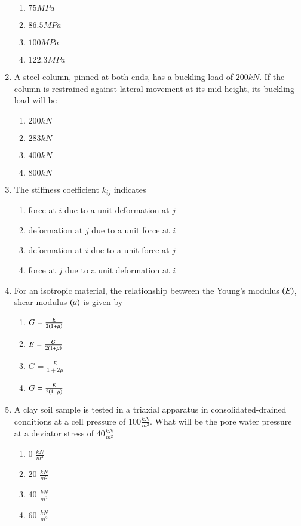 \documentclass[journal]{IEEEtran}
\begin{document}
\begin{enumerate}
\begin{enumerate}
			\item $75 MPa$
			\item $86.5 MPa$
			\item $100 MPa$
			\item $122.3 MPa$
		\end{enumerate}
	\item
	A steel column, pinned at both ends, has a buckling load of $200 kN$. If the column is restrained against lateral movement at its mid-height, its buckling load will be 
		\begin{enumerate}
			\item $200 kN$
			\item $283 kN$
			\item $400 kN$
			\item $800 kN$
		\end{enumerate}
	\item
	The stiffness coefficient $k_{ij}$ indicates
		\begin{enumerate}
			\item force at $i$ due to a unit deformation at $j$
			\item deformation at $j$ due to a unit force at $i$
			\item deformation at $i$ due to a unit force at $j$
			\item force at $j$ due to a unit deformation at $i$
		\end{enumerate}
	\item
	For an isotropic material, the relationship between the Young's modulus $\left(E\right)$, shear modulus $\left(\mu\right)$ is given by 
		\begin{enumerate}
			\item $G = \frac{E}{2\left(1+\mu\right)}$
			\item $E = \frac{G}{2\left(1+\mu\right)}$
			\item $G = \frac{E}{1 + 2\mu}$
			\item $G = \frac{E}{2\left(1-\mu\right)}$
		\end{enumerate}
	\item
	A clay soil sample is tested in a triaxial apparatus in consolidated-drained conditions at a cell pressure of $100 \frac{kN}{m^2}$. What will be the pore water pressure at a deviator stress of $40 \frac{kN}{m^2}$
		\begin{enumerate}
			\item 0 $\frac{kN}{m^2}$
			\item 20 $\frac{kN}{m^2}$
			\item 40 $\frac{kN}{m^2}$
			\item 60 $\frac{kN}{m^2}$

\end{enumerate}
\end{enumerate}
\end{document}
